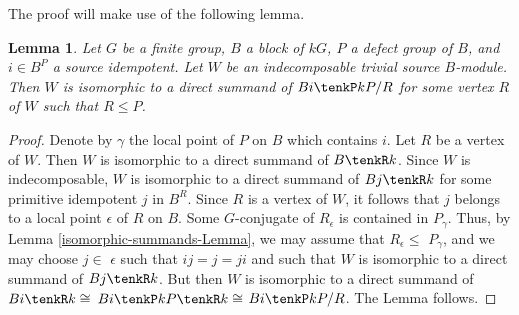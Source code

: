 \documentclass{amsart}
\theoremstyle{plain}\newtheorem{Theorem}{Theorem}[section]
\theoremstyle{plain}\newtheorem{Conjecture}[Theorem]{Conjecture}
\theoremstyle{plain}\newtheorem{Corollary}[Theorem]{Corollary}
\theoremstyle{plain}\newtheorem{Lemma}[Theorem]{Lemma}
\theoremstyle{plain}\newtheorem{Proposition}[Theorem]{Proposition}
\theoremstyle{definition}\newtheorem{Definition}[Theorem]{Definition}
\theoremstyle{definition}\newtheorem{Example}[Theorem]{Example}
\theoremstyle{definition}\newtheorem{Examples}[Theorem]{Examples}
\theoremstyle{definition}\newtheorem{Exercise}[Theorem]{Exercise}
\theoremstyle{definition}\newtheorem{Notation}[Theorem]{Notation}
\theoremstyle{definition}\newtheorem{Remark}[Theorem]{Remark}
\theoremstyle{definition}\newtheorem{Remarks}[Theorem]{Remarks}
\theoremstyle{plain}\newtheorem{Statement}[Theorem]{}
\begin{document}
The proof will make use of the following lemma. 


\begin{Lemma} \label{Bi-summands-Lemma}
Let $G$ be a finite group, $B$ a block of $kG$, $P$ a defect group of $B$, and
$i\in B^P$ a source idempotent. Let $W$ be an indecomposable trivial source
$B$-module. Then $W$ is isomorphic to a direct summand of $Bi \tenkP kP/R$ for 
some vertex $R$ of $W$ such that $R\leq P$. 
\end{Lemma}

\begin{proof}
Denote by $\gamma$ the local point of $P$ on $B$ which contains $i$.   Let $R$ 
be a vertex of $W$. Then $W$ is isomorphic to a direct summand of $B\tenkR k$. 
Since $W$ is indecomposable, $W$ is isomorphic to a direct summand of 
$Bj\tenkR k$  for some primitive idempotent $j$ in $B^R$. Since $R$ is a vertex 
of $W$, it  follows that $j$ belongs to a local point $\epsilon$ of $R$ on $B$. 
Some $G$-conjugate of $R_\epsilon$ is contained in $P_\gamma$. Thus, by 
Lemma \ref{isomorphic-summands-Lemma}, we may assume that 
$R_\epsilon\leq$ $P_\gamma$, and we may choose $j\in$ $\epsilon$ such that 
$ij=j=ji$ and such that $W$ is isomorphic to a direct summand of $Bj\tenkR k$. 
But then $W$ is isomorphic to a direct summand of $Bi\tenkR k\cong$
$Bi \tenkP kP\tenkR k\cong$ $Bi\tenkP kP/R$. The Lemma follows.
\end{proof}
\end{document}
